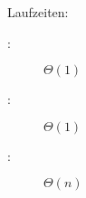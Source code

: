 Laufzeiten:
\begin{description}
	\item[\makeset:] $\Theta(1)$
	\item[\find:] $\Theta(1)$
	\item[\union:] $\Theta(n)$
\end{description}
